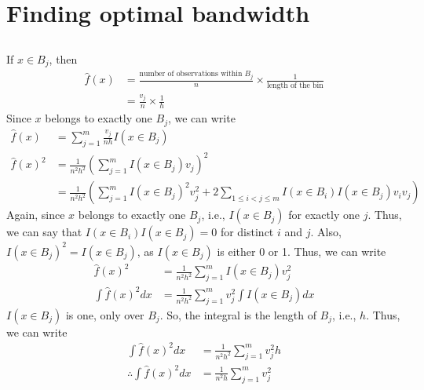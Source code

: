 \section{Finding optimal bandwidth}
\subsection{}
If $x\in B_j$, then
\begin{align*}
	\hat{f}(x) & = \frac{\textrm{number of observations within }B_j}{n} \times \frac{1}{\textrm{length of the bin}} \\
	           & =  \frac{v_j}{n} \times \frac{1}{h}
\end{align*}
Since $x$ belongs to exactly one $B_j$, we can write
\begin{align*}
	\hat{f}(x)   & = \sum_{j=1}^m \frac{v_j}{nh} I\left(x\in B_j\right)                                                                                                 \\
	\hat{f}(x)^2 & = \frac{1}{n^2h^2} \left(\sum_{j=1}^m I\left(x\in B_j\right) v_j \right)^2                                                                           \\
	             & = \frac{1}{n^2h^2} \left(\sum_{j=1}^m I\left(x\in B_j\right)^2 v_j^2 + 2\sum_{1\leq i < j \leq m} I\left(x \in B_i\right)I(x \in B_j)v_i v_j \right)
\end{align*}
Again, since $x$ belongs to exactly one $B_j$, i.e., $I\left(x\in B_j\right)$ for exactly one $j$. Thus, we can say that $I(x\in B_i) I\left(x\in B_j\right) = 0$ for distinct $i$ and $j$.
Also, $I\left(x\in B_j\right)^2 = I\left(x\in B_j\right)$, as $I\left(x\in B_j\right)$ is either 0 or 1. Thus, we can write
\begin{align*}
	\hat{f}(x)^2         & = \frac{1}{n^2h^2} \sum_{j=1}^m I\left(x\in B_j\right) v_j^2         \\
	\int \hat{f}(x)^2 dx & = \frac{1}{n^2h^2} \sum_{j=1}^m v_j^2 \int I\left(x\in B_j\right) dx
\end{align*}
$I\left(x\in B_j\right)$ is one, only over $B_j$. So, the integral is the length of $B_j$, i.e., $h$. Thus, we can write
\begin{align*}
	\int \hat{f}(x)^2 dx            & = \frac{1}{n^2h^2} \sum_{j=1}^m v_j^2 h \\
	\therefore \int \hat{f}(x)^2 dx & = \frac{1}{n^2h} \sum_{j=1}^m v_j^2
\end{align*}
\subsection{}
